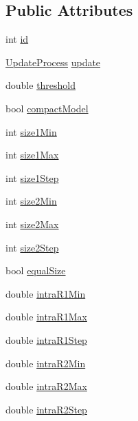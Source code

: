 \subsection*{Public Attributes}
\begin{DoxyCompactItemize}
\item 
int \hyperlink{class_voter_experiment_a013f931e0562435c97530c8a4be7042e}{id}
\item 
\hyperlink{voter__graph_8hpp_ab3bec55c359e4ed771339c8bc61fc35a}{Update\+Process} \hyperlink{class_voter_experiment_af6c2b58598cbf149ba835dc1da4c327a}{update}
\item 
double \hyperlink{class_voter_experiment_a03efdf4f20508ff7bcc6fd5c0e29a9c0}{threshold}
\item 
bool \hyperlink{class_voter_experiment_a040b07572c50cab60e5777bf31143a76}{compact\+Model}
\item 
int \hyperlink{class_voter_experiment_a2f6b6040d2fb3f5d44276e0c9a137806}{size1\+Min}
\item 
int \hyperlink{class_voter_experiment_a351c47da6acaf3e4310d8eaed8471dc3}{size1\+Max}
\item 
int \hyperlink{class_voter_experiment_aca18061e6ee12ea935792b34fe245d87}{size1\+Step}
\item 
int \hyperlink{class_voter_experiment_aa4865f2c06bd9bfdf136536e7b4e2297}{size2\+Min}
\item 
int \hyperlink{class_voter_experiment_a5a0a8935b13623bb196fda30c8c5e0e0}{size2\+Max}
\item 
int \hyperlink{class_voter_experiment_a0c06dcb42e19c7879e1becc9b3d6a5df}{size2\+Step}
\item 
bool \hyperlink{class_voter_experiment_accbcfbfc5929ac118cda138f5cf9f702}{equal\+Size}
\item 
double \hyperlink{class_voter_experiment_affe7cb18bec707f3e07ef494f884b571}{intra\+R1\+Min}
\item 
double \hyperlink{class_voter_experiment_a47c5094262c72f2ef4d41f0592ac91e5}{intra\+R1\+Max}
\item 
double \hyperlink{class_voter_experiment_ad1942e9491c0eb3bc8b27647224ec6fc}{intra\+R1\+Step}
\item 
double \hyperlink{class_voter_experiment_a95db9758a55853d37f40ea5422477f28}{intra\+R2\+Min}
\item 
double \hyperlink{class_voter_experiment_a3ed3ee17da83a374fe1f35a995352ac7}{intra\+R2\+Max}
\item 
double \hyperlink{class_voter_experiment_a6239bcb8949bc8c5aab8d76c02e514af}{intra\+R2\+Step}

\end{DoxyCompactItemize}
